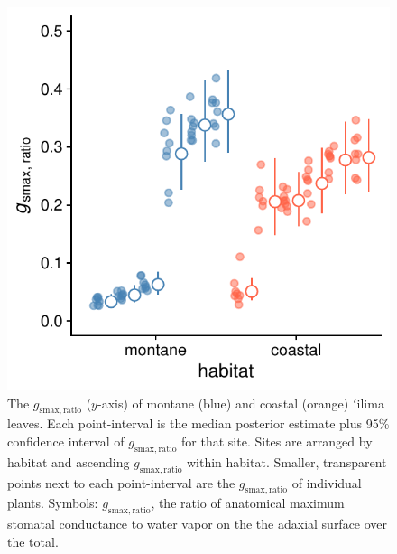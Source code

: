 \documentclass[
  letterpaper,
  DIV=11,
  numbers=noendperiod]{scrartcl}
\begin{document}
\begin{figure}
  \includegraphics{../figures/habitat-gmaxratio.pdf}
  \caption{The $g_\mathrm{smax,ratio}$ ($y$-axis) of montane (blue) and coastal (orange) ʻilima leaves. Each point-interval is the median posterior estimate plus 95\% confidence interval of $g_\mathrm{smax,ratio}$ for that site. Sites are arranged by habitat and ascending $g_\mathrm{smax,ratio}$ within habitat. Smaller, transparent points next to each point-interval are the $g_\mathrm{smax,ratio}$ of individual plants. Symbols: $g_\mathrm{smax,ratio}$, the ratio of anatomical maximum stomatal conductance to water vapor on the the adaxial surface over the total.}
  \label{fig:habitat-gmaxratio}
\end{figure}
\end{document}
